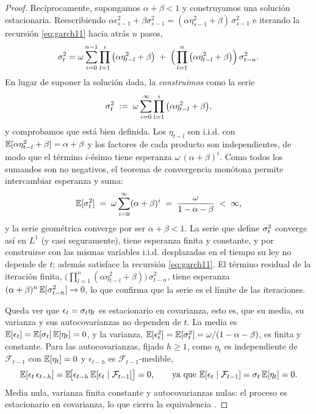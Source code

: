 \begin{proof}
Recíprocamente, supongamos $\alpha + \beta < 1$ y construyamos una solución estacionaria. Reescribiendo $\alpha \epsilon_{s-1}^2 + \beta \sigma_{s-1}^2 = (\alpha \eta_{s-1}^2 + \beta)\,\sigma_{s-1}^2$ e iterando la recursión \eqref{eq:garch11} hacia atrás $n$ pasos,
\[
\sigma_t^2 = \omega \sum_{i=0}^{n-1} \prod_{l=1}^{i}\big(\alpha \eta_{t-l}^2 + \beta\big) \;+\; \Big(\prod_{l=1}^{n}\big(\alpha \eta_{t-l}^2 + \beta\big)\Big)\,\sigma_{t-n}^2.
\]
En lugar de suponer la solución dada, la \emph{construimos} como la serie
\[
\sigma_t^2 \;:=\; \omega \sum_{i=0}^{\infty} \prod_{l=1}^{i}\big(\alpha \eta_{t-l}^2 + \beta\big),
\]
y comprobamos que está bien definida. Los $\eta_{t-l}$ son i.i.d. con $\mathbb{E}[\alpha \eta_{t-l}^2 + \beta] = \alpha + \beta$ y los factores de cada producto son independientes, de modo que el término $i$-ésimo tiene esperanza $\omega\,(\alpha+\beta)^i$. Como todos los sumandos son no negativos, el teorema de convergencia monótona permite intercambiar esperanza y suma:
\[
\mathbb{E}[\sigma_t^2] \;=\; \omega \sum_{i=0}^{\infty} (\alpha+\beta)^i \;=\; \frac{\omega}{1-\alpha-\beta} \;<\; \infty,
\]
y la serie geométrica converge por ser $\alpha+\beta<1$. La serie que define $\sigma_t^2$ converge así en $L^1$ (y casi seguramente), tiene esperanza finita y constante, y por construirse con las mismas variables i.i.d. desplazadas en el tiempo su ley no depende de $t$; además satisface la recursión \eqref{eq:garch11}. El término residual de la iteración finita, $\big(\prod_{l=1}^{n}(\alpha \eta_{t-l}^2+\beta)\big)\,\sigma_{t-n}^2$, tiene esperanza $(\alpha+\beta)^n\,\mathbb{E}[\sigma_{t-n}^2] \to 0$, lo que confirma que la serie es el límite de las iteraciones.

Queda ver que $\epsilon_t = \sigma_t \eta_t$ es estacionario en covarianza, esto es, que su media, su varianza y sus autocovarianzas no dependen de $t$. La media es $\mathbb{E}[\epsilon_t] = \mathbb{E}[\sigma_t]\,\mathbb{E}[\eta_t] = 0$, y la varianza, $\mathbb{E}[\epsilon_t^2] = \mathbb{E}[\sigma_t^2] = \omega/(1-\alpha-\beta)$, es finita y constante. Para las autocovarianzas, fijado $h \ge 1$, como $\eta_t$ es independiente de $\mathcal{F}_{t-1}$ con $\mathbb{E}[\eta_t]=0$ y $\epsilon_{t-h}$ es $\mathcal{F}_{t-1}$-medible,
\[
\mathbb{E}[\epsilon_t\, \epsilon_{t-h}] = \mathbb{E}\!\big[\epsilon_{t-h}\,\mathbb{E}[\epsilon_t \mid \mathcal{F}_{t-1}]\big] = 0,
\qquad \text{ya que } \mathbb{E}[\epsilon_t \mid \mathcal{F}_{t-1}] = \sigma_t\,\mathbb{E}[\eta_t] = 0.
\]
Media nula, varianza finita constante y autocovarianzas nulas: el proceso es estacionario en covarianza, lo que cierra la equivalencia \cite{nelson1990, francqzakoian2019}.
\end{proof}


